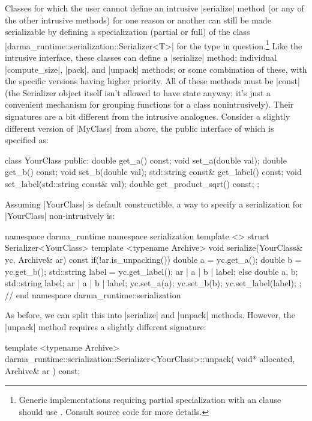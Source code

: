 Classes for which the user cannot define an intrusive |serialize| method (or
any of the other intrusive methods) for one reason or another can still be
made serializable by defining a specialization (partial or full) of the class
|darma_runtime::serialization::Serializer<T>| for the type in
question.\footnote{Generic implementations requiring partial specialization
  with an  clause should use
.  Consult source code for more details.}  Like the intrusive interface,
these classes can define a |serialize| method; individual |compute_size|,
|pack|, and |unpack| methods; or some combination of these, with the specific
versions having higher priority.  All of these methods must be |const| (the
Serializer object itself isn't allowed to have state anyway; it's just a
convenient mechanism for grouping functions for a class nonintrusively).  Their
signatures are a bit different from the intrusive analogues.  Consider a
slightly different version of |MyClass| from above, the public
interface of which is specified as:
\begin{CppCodeNumb}
class YourClass {
  public:
    double get_a() const;
    void set_a(double val);
    double get_b() const;
    void set_b(double val);
    std::string const& get_label() const;
    void set_label(std::string const& val);
    double get_product_sqrt() const;
};
\end{CppCodeNumb}
Assuming |YourClass| is default constructible, a way to specify a serialization
for |YourClass| non-intrusively is:
\begin{CppCodeNumb}
namespace darma_runtime { namespace serialization {
template <>
struct Serializer<YourClass> {
  template <typename Archive>
  void serialize(YourClass& yc, Archive& ar) const {
    if(!ar.is_unpacking()) {
      double a = yc.get_a();
      double b = yc.get_b();
      std::string label = yc.get_label();
      ar | a | b | label;
    }
    else {
      double a, b;
      std::string label;
      ar | a | b | label;
      yc.set_a(a);
      yc.set_b(b);
      yc.set_label(label);
    }
  }
};
}} // end namespace darma_runtime::serialization
\end{CppCodeNumb}
As before, we can split this into |serialize| and |unpack| methods.  However,
the |unpack| method requires a slightly different signature:
\begin{CppCodeNumb}
template <typename Archive>
darma_runtime::serialization::Serializer<YourClass>::unpack(
  void* allocated, Archive& ar
) const;
\end{CppCodeNumb}
